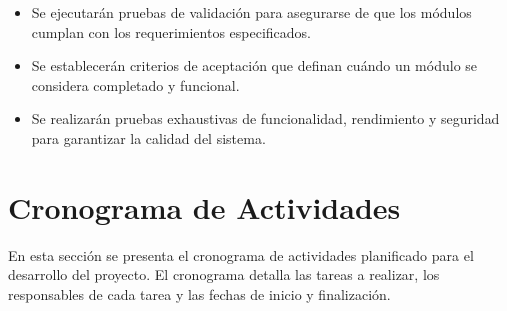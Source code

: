 \documentclass{article}
\begin{document}
\begin{itemize}
    \item Se ejecutarán pruebas de validación para asegurarse de que los módulos cumplan con los requerimientos especificados.
    \item Se establecerán criterios de aceptación que definan cuándo un módulo se considera completado y funcional.
    \item Se realizarán pruebas exhaustivas de funcionalidad, rendimiento y seguridad para garantizar la calidad del sistema.
\end{itemize}
\section{Cronograma de Actividades}

En esta sección se presenta el cronograma de actividades planificado para el desarrollo del proyecto. El cronograma detalla las tareas a realizar, los responsables de cada tarea y las fechas de inicio y finalización.
\end{document}
